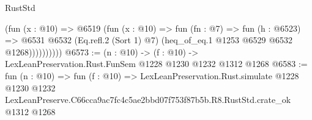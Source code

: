 \begin{lexlean}{RustStd}
\begin{coremodule}
                  (fun (x : @10) =>
                  @6519
                    (fun (x : @10) =>
                    fun (fn : @7) =>
                    fun (h : @6523) =>
                    @6531
                      @6532
                      (Eq.refl.{2} (Sort 1) @7)
                      (heq_of_eq.{1} @1253 @6529 @6532 @1268))))))))))
@6573 := (n : @10) -> (f : @10) -> LexLeanPreservation.Rust.FunSem @1228 @1230 @1232 @1312 @1268
@6583 := fun (n : @10) =>
  fun (f : @10) =>
  LexLeanPreservation.Rust.simulate
    @1228
    @1230
    @1232
    LexLeanPreserve.C66cca9ac7fc4c5ae2bbd07f753f87b5b.R8.RustStd.crate_ok
    @1312
    @1268
\end{coremodule}
\end{lexlean}
